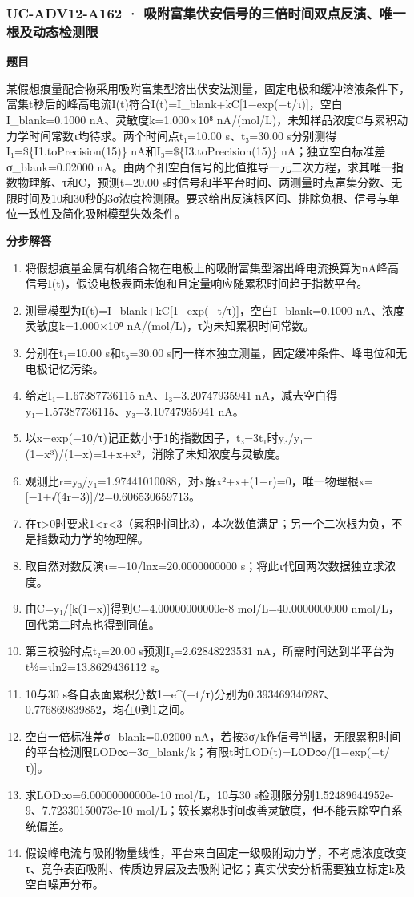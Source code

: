 \documentclass[UTF8,11pt,a4paper]{ctexart}
\begin{document}
\subsubsection*{UC-ADV12-A162 · 吸附富集伏安信号的三倍时间双点反演、唯一根及动态检测限}
\noindent\textbf{题目}\par
某假想痕量配合物采用吸附富集型溶出伏安法测量，固定电极和缓冲溶液条件下，富集t秒后的峰高电流I(t)符合I(t)=I\_blank+kC[1−exp(−t/τ)]，空白I\_blank=0.1000 nA、灵敏度k=1.000×10⁸ nA/(mol/L)，未知样品浓度C与累积动力学时间常数τ均待求。两个时间点t₁=10.00 s、t₃=30.00 s分别测得I₁=\$\{I1.toPrecision(15)\} nA和I₃=\$\{I3.toPrecision(15)\} nA；独立空白标准差σ\_blank=0.02000 nA。由两个扣空白信号的比值推导一元二次方程，求其唯一指数物理解、τ和C，预测t=20.00 s时信号和半平台时间、两测量时点富集分数、无限时间及10和30秒的3σ浓度检测限。要求给出反演根区间、排除负根、信号与单位一致性及简化吸附模型失效条件。\par
\medskip\noindent\textbf{分步解答}
\begin{enumerate}
\item 将假想痕量金属有机络合物在电极上的吸附富集型溶出峰电流换算为nA峰高信号I(t)，假设电极表面未饱和且定量响应随累积时间趋于指数平台。
\item 测量模型为I(t)=I\_blank+kC[1−exp(−t/τ)]，空白I\_blank=0.1000 nA、浓度灵敏度k=1.000×10⁸ nA/(mol/L)，τ为未知累积时间常数。
\item 分别在t₁=10.00 s和t₃=30.00 s同一样本独立测量，固定缓冲条件、峰电位和无电极记忆污染。
\item 给定I₁=1.67387736115 nA、I₃=3.20747935941 nA，减去空白得y₁=1.57387736115、y₃=3.10747935941 nA。
\item 以x=exp(−10/τ)记正数小于1的指数因子，t₃=3t₁时y₃/y₁=(1−x³)/(1−x)=1+x+x²，消除了未知浓度与灵敏度。
\item 观测比r=y₃/y₁=1.97441010088，对x解x²+x+(1−r)=0，唯一物理根x=[−1+√(4r−3)]/2=0.606530659713。
\item 在τ>0时要求1<r<3（累积时间比3），本次数值满足；另一个二次根为负，不是指数动力学的物理解。
\item 取自然对数反演τ=−10/lnx=20.0000000000 s；将此τ代回两次数据独立求浓度。
\item 由C=y₁/[k(1−x)]得到C=4.00000000000e-8 mol/L=40.0000000000 nmol/L，回代第二时点也得到同值。
\item 第三校验时点t₂=20.00 s预测I₂=2.62848223531 nA，所需时间达到半平台为t½=τln2=13.8629436112 s。
\item 10与30 s各自表面累积分数1−e\textasciicircum{}(−t/τ)分别为0.393469340287、0.776869839852，均在0到1之间。
\item 空白一倍标准差σ\_blank=0.02000 nA，若按3σ/k作信号判据，无限累积时间的平台检测限LOD∞=3σ\_blank/k；有限t时LOD(t)=LOD∞/[1−exp(−t/τ)]。
\item 求LOD∞=6.00000000000e-10 mol/L，10与30 s检测限分别1.52489644952e-9、7.72330150073e-10 mol/L；较长累积时间改善灵敏度，但不能去除空白系统偏差。
\item 假设峰电流与吸附物量线性，平台来自固定一级吸附动力学，不考虑浓度改变τ、竞争表面吸附、传质边界层及去吸附记忆；真实伏安分析需要独立标定k及空白噪声分布。
\end{enumerate}
\end{document}
